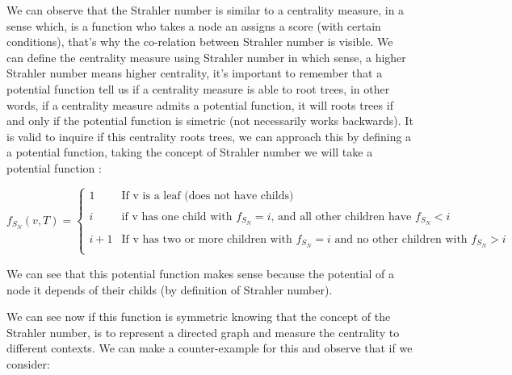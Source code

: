 
We can observe that the Strahler number is similar to a centrality measure, in a sense which, is a function who takes a node an assigns a score (with certain conditions), that's why the co-relation between Strahler number is visible. We can define the centrality measure using Strahler number in which sense, a higher Strahler number means higher centrality, it's important to remember that a potential function tell us if a centrality measure is able to root trees, in other words, if a centrality measure admits a potential function, it will roots trees if and only if the potential function is simetric (not necessarily works backwards). It is valid to inquire if this centrality roots trees, we can approach this by defining a a potential function, taking the concept of Strahler number we will take a potential function :

    \begin{equation}
        f_{S_{N}} (v,T) = \left\{ \begin{array}{llc}
             1 &   \text{If v is a leaf (does not have childs)}  &\\
             \\ i & \text{if v has one child with  $f_{S_{N}} = i$, and all other children have  $f_{S_{N}} < i$} \\
             \\ i + 1 &  \text{If v has two or more children with $f_{S_{N}} = i$ and no other children with $f_{S_{N}} > i$} \\
             \end{array}
   \right.
    \end{equation}
    
We can see that this potential function makes sense because the potential of a node it depends of their childs (by definition of Strahler number).

We can see now if this function is symmetric knowing that the concept of the Strahler number, is to represent a directed graph and measure the centrality to different contexts. We can make a counter-example for this and observe that if we consider:
\begin{center}
\end{center}


